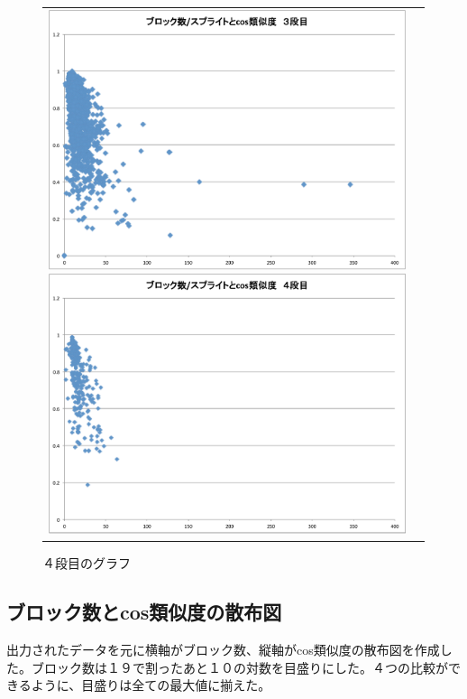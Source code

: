 \documentclass[a4paper,10pt,onecolumn,oneside,openany]{jsbook}
\begin{document}
\begin{figure}[h]
\begin{tabular}{cc}
 	\begin{minipage}[t]{0.45\hsize}
	 \centering
	 \includegraphics[keepaspectratio, scale = 0.25]{block_per_splite_3.pdf}
	 \caption{３段目のグラフ}
	 \label{third_block_per_splite}
	\end{minipage}
        \begin{minipage}[t]{0.45\hsize}
	 \centering
	 \includegraphics[keepaspectratio, scale = 0.25]{block_per_splite_4.pdf}
	 \caption{４段目のグラフ}
	 \label{fourth_block_per_splite}
	\end{minipage}
 \end{tabular}
 \end{figure}

\newpage
\subsection{ブロック数とcos類似度の散布図}
 出力されたデータを元に横軸がブロック数、縦軸がcos類似度の散布図を作成した。ブロック数は１９で割ったあと１０の対数を目盛りにした。４つの比較ができるように、目盛りは全ての最大値に揃えた。
\end{document}

